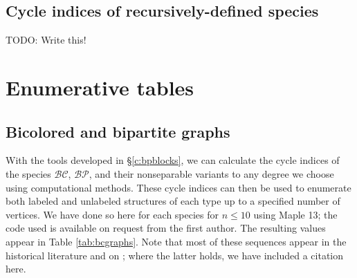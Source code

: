 \documentclass[sectionflow,singlespace,twoside,boldmathhdr,draft]{brandiss} %
\numberwithin{section}{chapter}
\numberwithin{figure}{chapter}
\begin{document}
\section{Cycle indices of recursively-defined species}\label{s:comprecurs}
TODO: Write this!

\chapter{Enumerative tables}\label{c:enum}
\section{Bicolored and bipartite graphs}\label{s:bpenum}
With the tools developed in \S \ref{c:bpblocks}, we can calculate the cycle indices of the species $\mathcal{BC}$, $\mathcal{BP}$, and their nonseparable variants to any degree we choose using computational methods.
These cycle indices can then be used to enumerate both labeled and unlabeled structures of each type up to a specified number of vertices.
We have done so here for each species for $n \leq 10$ using Maple 13; the code used is available on request from the first author.
The resulting values appear in Table \ref{tab:bcgraphs}.
Note that most of these sequences appear in the historical literature and on \cite{oeis}; where the latter holds, we have included a citation here.
\end{document}
